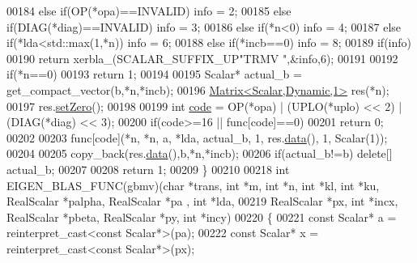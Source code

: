 \begin{DoxyCode}
00184   \textcolor{keywordflow}{else} \textcolor{keywordflow}{if}(OP(*opa)==INVALID)                                          info = 2;
00185   \textcolor{keywordflow}{else} \textcolor{keywordflow}{if}(DIAG(*diag)==INVALID)                                       info = 3;
00186   \textcolor{keywordflow}{else} \textcolor{keywordflow}{if}(*n<0)                                                       info = 4;
00187   \textcolor{keywordflow}{else} \textcolor{keywordflow}{if}(*lda<std::max(1,*n))                                        info = 6;
00188   \textcolor{keywordflow}{else} \textcolor{keywordflow}{if}(*incb==0)                                                   info = 8;
00189   \textcolor{keywordflow}{if}(info)
00190     \textcolor{keywordflow}{return} xerbla\_(SCALAR\_SUFFIX\_UP\textcolor{stringliteral}{"TRMV "},&info,6);
00191 
00192   \textcolor{keywordflow}{if}(*n==0)
00193     \textcolor{keywordflow}{return} 1;
00194 
00195   Scalar* actual\_b = get\_compact\_vector(b,*n,*incb);
00196   \hyperlink{group___core___module}{Matrix<Scalar,Dynamic,1>} res(*n);
00197   res.\hyperlink{class_eigen_1_1_plain_object_base_ac21ad5f989f320e46958b75ac8d9a1da}{setZero}();
00198 
00199   \textcolor{keywordtype}{int} \hyperlink{structcode}{code} = OP(*opa) | (UPLO(*uplo) << 2) | (DIAG(*diag) << 3);
00200   \textcolor{keywordflow}{if}(code>=16 || func[code]==0)
00201     \textcolor{keywordflow}{return} 0;
00202 
00203   func[code](*n, *n, a, *lda, actual\_b, 1, res.\hyperlink{class_eigen_1_1_plain_object_base_ac25699535374b1854cf8494e44ad31b2}{data}(), 1, Scalar(1));
00204 
00205   copy\_back(res.\hyperlink{class_eigen_1_1_plain_object_base_ac25699535374b1854cf8494e44ad31b2}{data}(),b,*n,*incb);
00206   \textcolor{keywordflow}{if}(actual\_b!=b) \textcolor{keyword}{delete}[] actual\_b;
00207 
00208   \textcolor{keywordflow}{return} 1;
00209 \}
00210 
00218 \textcolor{keywordtype}{int} EIGEN\_BLAS\_FUNC(gbmv)(\textcolor{keywordtype}{char} *trans, \textcolor{keywordtype}{int} *m, \textcolor{keywordtype}{int} *n, \textcolor{keywordtype}{int} *kl, \textcolor{keywordtype}{int} *ku, RealScalar *palpha, RealScalar *pa
      , \textcolor{keywordtype}{int} *lda,
00219                           RealScalar *px, \textcolor{keywordtype}{int} *incx, RealScalar *pbeta, RealScalar *py, \textcolor{keywordtype}{int} *incy)
00220 \{
00221   \textcolor{keyword}{const} Scalar* a = \textcolor{keyword}{reinterpret\_cast<}\textcolor{keyword}{const }Scalar*\textcolor{keyword}{>}(pa);
00222   \textcolor{keyword}{const} Scalar* x = \textcolor{keyword}{reinterpret\_cast<}\textcolor{keyword}{const }Scalar*\textcolor{keyword}{>}(px);

\end{DoxyCode}
